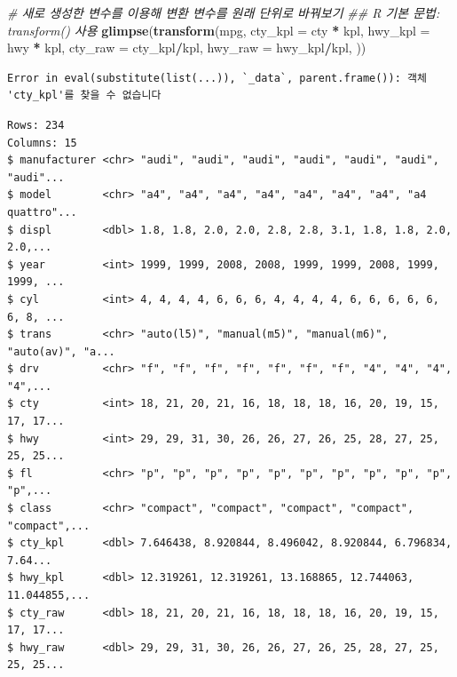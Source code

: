 \documentclass[
  11pt,
]{krantz}
\newenvironment{Shaded}{\begin{snugshade}}{\end{snugshade}}
\newcommand{\CommentTok}[1]{\textcolor[rgb]{0.37,0.37,0.37}{\textit{#1}}}
\newcommand{\DataTypeTok}[1]{\textcolor[rgb]{0.27,0.27,0.27}{#1}}
\newcommand{\KeywordTok}[1]{\textcolor[rgb]{0.27,0.27,0.27}{\textbf{#1}}}
\newcommand{\NormalTok}[1]{#1}
\newcommand{\OperatorTok}[1]{\textcolor[rgb]{0.43,0.43,0.43}{\textbf{#1}}}
\newcommand{\StringTok}[1]{\textcolor[rgb]{0.5,0.5,0.5}{#1}}
\begin{document}
\begin{Shaded}
\begin{Highlighting}[]
\CommentTok{# 새로 생성한 변수를 이용해 변환 변수를 원래 단위로 바꿔보기}
\CommentTok{## R 기본 문법: transform() 사용}
\KeywordTok{glimpse}\NormalTok{(}\KeywordTok{transform}\NormalTok{(mpg, }
                  \DataTypeTok{cty_kpl =}\NormalTok{ cty }\OperatorTok{*}\StringTok{ }\NormalTok{kpl, }
                  \DataTypeTok{hwy_kpl =}\NormalTok{ hwy }\OperatorTok{*}\StringTok{ }\NormalTok{kpl,}
                  \DataTypeTok{cty_raw =}\NormalTok{ cty_kpl}\OperatorTok{/}\NormalTok{kpl,}
                  \DataTypeTok{hwy_raw =}\NormalTok{ hwy_kpl}\OperatorTok{/}\NormalTok{kpl,}
\NormalTok{                  )) }
\end{Highlighting}
\end{Shaded}

\begin{verbatim}
Error in eval(substitute(list(...)), `_data`, parent.frame()): 객체 'cty_kpl'를 찾을 수 없습니다
\end{verbatim}

\begin{Shaded}
\end{Shaded}

\begin{verbatim}
Rows: 234
Columns: 15
$ manufacturer <chr> "audi", "audi", "audi", "audi", "audi", "audi", "audi"...
$ model        <chr> "a4", "a4", "a4", "a4", "a4", "a4", "a4", "a4 quattro"...
$ displ        <dbl> 1.8, 1.8, 2.0, 2.0, 2.8, 2.8, 3.1, 1.8, 1.8, 2.0, 2.0,...
$ year         <int> 1999, 1999, 2008, 2008, 1999, 1999, 2008, 1999, 1999, ...
$ cyl          <int> 4, 4, 4, 4, 6, 6, 6, 4, 4, 4, 4, 6, 6, 6, 6, 6, 6, 8, ...
$ trans        <chr> "auto(l5)", "manual(m5)", "manual(m6)", "auto(av)", "a...
$ drv          <chr> "f", "f", "f", "f", "f", "f", "f", "4", "4", "4", "4",...
$ cty          <int> 18, 21, 20, 21, 16, 18, 18, 18, 16, 20, 19, 15, 17, 17...
$ hwy          <int> 29, 29, 31, 30, 26, 26, 27, 26, 25, 28, 27, 25, 25, 25...
$ fl           <chr> "p", "p", "p", "p", "p", "p", "p", "p", "p", "p", "p",...
$ class        <chr> "compact", "compact", "compact", "compact", "compact",...
$ cty_kpl      <dbl> 7.646438, 8.920844, 8.496042, 8.920844, 6.796834, 7.64...
$ hwy_kpl      <dbl> 12.319261, 12.319261, 13.168865, 12.744063, 11.044855,...
$ cty_raw      <dbl> 18, 21, 20, 21, 16, 18, 18, 18, 16, 20, 19, 15, 17, 17...
$ hwy_raw      <dbl> 29, 29, 31, 30, 26, 26, 27, 26, 25, 28, 27, 25, 25, 25...
\end{verbatim}
\end{document}

